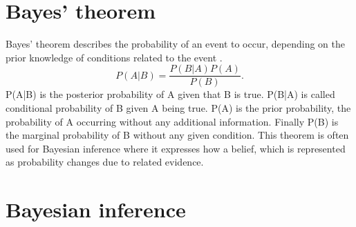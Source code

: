 \section{Bayes' theorem}

Bayes' theorem describes the probability of an event to occur, depending on the prior knowledge of conditions related to the event \citep{bayesBasic}. 
\begin{equation}
\label{eqn:bayesianTheorem}
P(A|B) = \frac{P(B|A)P(A)}{P(B)}.
\end{equation}
P(A|B) is the posterior probability of A given that B is true. P(B|A) is called conditional probability of B given A being true. P(A) is the prior probability, the probability of A occurring without any additional information. Finally P(B) is the marginal probability of B without any given condition. This theorem is often used for Bayesian inference where it expresses how a belief, which is represented as probability changes due to related evidence.	

\section{Bayesian inference}
\label{section:bayesianInference}

